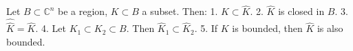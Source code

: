 Let $B \subset \mathbb{C}^n$ be a region, $K \subset B$ a subset. Then:
1. $K \subset \hat{K}$.
2. $\hat{K}$ is closed in $B$.
3. $\widehat{\hat{K}} = \hat{K}$.
4. Let $K_1 \subset K_2 \subset B$. Then $\hat{K}_1 \subset \hat{K}_2$.
5. If $K$ is bounded, then $\hat{K}$ is also bounded.
